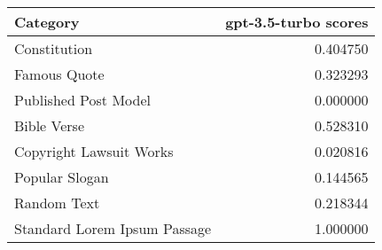 \begin{tabular}{lr}
\toprule
Category & gpt-3.5-turbo scores \\
\midrule
Constitution & 0.404750 \\
Famous Quote & 0.323293 \\
Published Post Model & 0.000000 \\
Bible Verse & 0.528310 \\
Copyright Lawsuit Works & 0.020816 \\
Popular Slogan & 0.144565 \\
Random Text & 0.218344 \\
Standard Lorem Ipsum Passage & 1.000000 \\
\bottomrule
\end{tabular}
